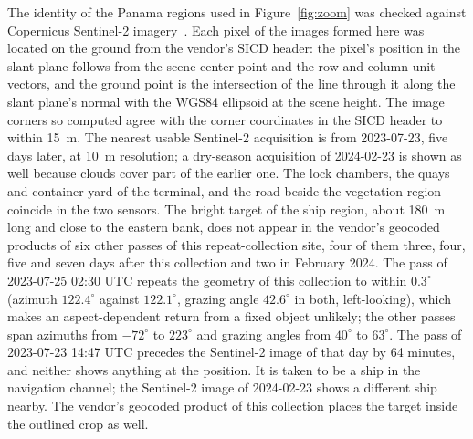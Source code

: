 \documentclass[11pt]{article}
\begin{document}
The identity of the Panama regions used in Figure~\ref{fig:zoom} was checked against Copernicus Sentinel-2 imagery~\cite{sentinel2}. Each pixel of the images formed here was located on the ground from the vendor's SICD header: the pixel's position in the slant plane follows from the scene center point and the row and column unit vectors, and the ground point is the intersection of the line through it along the slant plane's normal with the WGS84 ellipsoid at the scene height. The image corners so computed agree with the corner coordinates in the SICD header to within 15~m. The nearest usable Sentinel-2 acquisition is from 2023-07-23, five days later, at 10~m resolution; a dry-season acquisition of 2024-02-23 is shown as well because clouds cover part of the earlier one. The lock chambers, the quays and container yard of the terminal, and the road beside the vegetation region coincide in the two sensors. The bright target of the ship region, about 180~m long and close to the eastern bank, does not appear in the vendor's geocoded products of six other passes of this repeat-collection site, four of them three, four, five and seven days after this collection and two in February 2024. The pass of 2023-07-25 02:30 UTC repeats the geometry of this collection to within $0.3^\circ$ (azimuth $122.4^\circ$ against $122.1^\circ$, grazing angle $42.6^\circ$ in both, left-looking), which makes an aspect-dependent return from a fixed object unlikely; the other passes span azimuths from $-72^\circ$ to $223^\circ$ and grazing angles from $40^\circ$ to $63^\circ$. The pass of 2023-07-23 14:47 UTC precedes the Sentinel-2 image of that day by 64 minutes, and neither shows anything at the position. It is taken to be a ship in the navigation channel; the Sentinel-2 image of 2024-02-23 shows a different ship nearby. The vendor's geocoded product of this collection places the target inside the outlined crop as well.
\end{document}
